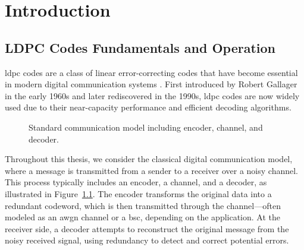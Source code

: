 \documentclass[../main.tex]{subfiles}
\begin{document}
\chapter{Introduction}
\label{chap:introduction}

\section{LDPC Codes Fundamentals and Operation} 
\label{sec:ldpc Codes}

\gls{ldpc} codes are a class of linear error-correcting codes that have become essential in modern digital communication systems \cite{3gpp38212}.
First introduced by Robert Gallager in the early 1960s \cite{gallager62} and later rediscovered in the 1990s, \gls{ldpc} codes are now widely used due to their near-capacity performance and efficient decoding algorithms.

\vspace{1em}
\begin{figure}[htbp]
    \centering
    \caption{Standard communication model including encoder, channel, and decoder.}
    \label{fig:comm_model}
\end{figure}
\vspace{1em}

Throughout this thesis, we consider the classical digital communication model, where a message is transmitted from a sender to a receiver over a noisy channel.
This process typically includes an encoder, a channel, and a decoder, as illustrated in Figure~\ref{fig:comm_model}.
The encoder transforms the original data into a redundant codeword, which is then transmitted through the channel—often modeled as an \gls{awgn} channel or a \gls{bsc}, depending on the application.
At the receiver side, a decoder attempts to reconstruct the original message from the noisy received signal, using redundancy to detect and correct potential errors.
\end{document}
